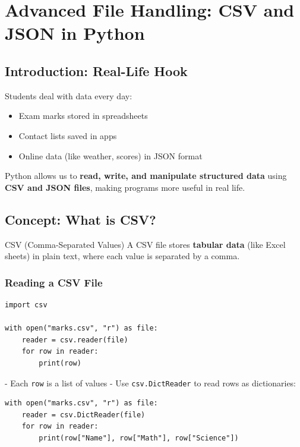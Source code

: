 \chapter{Advanced File Handling: CSV and JSON in Python}

\section{Introduction: Real-Life Hook}

Students deal with data every day:  

\begin{itemize}
    \item Exam marks stored in spreadsheets  
    \item Contact lists saved in apps  
    \item Online data (like weather, scores) in JSON format  
\end{itemize}

Python allows us to \textbf{read, write, and manipulate structured data} using \textbf{CSV and JSON files}, making programs more useful in real life.

\section{Concept: What is CSV?}

\begin{definition}{CSV (Comma-Separated Values)}
A CSV file stores \textbf{tabular data} (like Excel sheets) in plain text, where each value is separated by a comma.
\end{definition}

\subsection{Reading a CSV File}

\begin{verbatim}
import csv

with open("marks.csv", "r") as file:
    reader = csv.reader(file)
    for row in reader:
        print(row)
\end{verbatim}

- Each \texttt{row} is a list of values  
- Use \texttt{csv.DictReader} to read rows as dictionaries:

\begin{verbatim}
with open("marks.csv", "r") as file:
    reader = csv.DictReader(file)
    for row in reader:
        print(row["Name"], row["Math"], row["Science"])
\end{verbatim}

